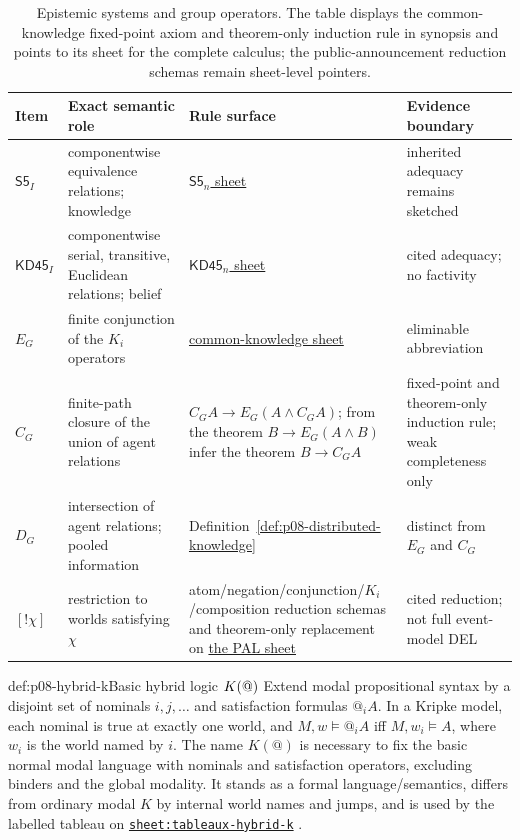 \begin{table}[!htbp]
\centering
\scriptsize
\begin{tabular}{@{}p{}p{}p{}p{}@{}}
\toprule
Item & Exact semantic role & Rule surface & Evidence boundary \\
\midrule
\(\mathsf{S5}_{I}\) & componentwise equivalence relations; knowledge &
\hyperref[sheet:hilbert-s5n]{\(\mathsf{S5}_n\) sheet} & inherited adequacy remains sketched \\
\(\mathsf{KD45}_{I}\) & componentwise serial, transitive, Euclidean relations;
belief & \hyperref[sheet:hilbert-kd45n]{\(\mathsf{KD45}_n\) sheet} & cited adequacy; no factivity \\
\(E_G\) & finite conjunction of the \(K_i\) operators &
\hyperref[sheet:hilbert-common-knowledge]{common-knowledge sheet} & eliminable abbreviation \\
  \(C_G\) & finite-path closure of the union of agent relations &
  \(C_GA\to E_G(A\land C_GA)\); from the theorem
  \(B\to E_G(A\land B)\) infer the theorem \(B\to C_GA\) & fixed-point and theorem-only induction rule;
  weak completeness only \\
  \(D_G\) & intersection of agent relations; pooled information &
  Definition~\ref{def:p08-distributed-knowledge} & distinct from \(E_G\) and \(C_G\) \\
  \([!\chi]\) & restriction to worlds satisfying \(\chi\) &
  atom/negation/conjunction/\(K_i\)/composition reduction schemas and
  theorem-only replacement on \hyperref[sheet:hilbert-pal]{the PAL sheet} & cited reduction; not full event-model DEL \\
\bottomrule
\end{tabular}
\caption{Epistemic systems and group operators.  The table displays the
common-knowledge fixed-point axiom and theorem-only induction rule in synopsis
and points to its sheet for the complete calculus; the public-announcement
reduction schemas remain sheet-level pointers.}
\label{tab:p08-epistemic-systems}
\end{table}

\begin{hbdefinition}{def:p08-hybrid-k}{Basic hybrid logic \(K({\char64})\)}
Extend modal propositional syntax by a disjoint set of nominals
\(i,j,\ldots\) and satisfaction formulas \(@_iA\). In a Kripke model, each
nominal is true at exactly one world, and
\(M,w\models@_iA\) iff \(M,w_i\models A\), where \(w_i\) is the world named by
\(i\). The name \(K(@)\) is necessary to fix the basic normal modal language
with nominals and satisfaction operators, excluding binders and the global
modality. It stands as a formal language/semantics, differs from ordinary
modal \(K\) by internal world names and jumps, and is used by the labelled
tableau on
\hyperref[sheet:tableaux-hybrid-k]{\texttt{sheet:tableaux-hybrid-k}}
\cite{ArecesTenCate2007}.
\end{hbdefinition}

